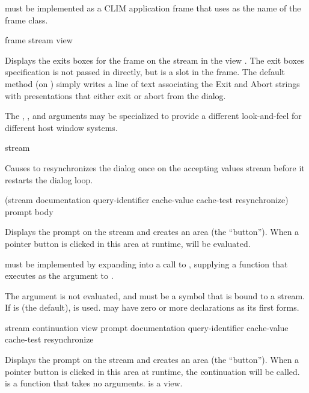 
 must be implemented as a CLIM application frame that uses
 as the name of the frame class.


 {frame stream view}

Displays the exits boxes for the  frame  on the
stream  in the view .  The exit boxes specification is not
passed in directly, but is a slot in the frame.  The default method (on
) simply writes a line of text associating the Exit and Abort
strings with presentations that either exit or abort from the dialog.

The , , and  arguments may be specialized to
provide a different look-and-feel for different host window systems.

 {stream}

Causes  to resynchronizes the dialog once on the accepting
values stream  before it restarts the dialog loop.


 {(\optional stream
                                           \key documentation query-identifier
                                                cache-value cache-test resynchronize) 
                                          prompt
                                          \body body}

Displays the prompt  on the stream  and creates an area
(the ``button'').  When a pointer button is clicked in this area at runtime,
 will be evaluated.

 must be implemented by expanding into a call
to , supplying a function that executes
 as the  argument to .

The  argument is not evaluated, and must be a symbol that is bound
to a stream.  If  is  (the default),  is used.
 may have zero or more declarations as its first forms.

           {stream continuation view prompt
            \key documentation query-identifier cache-value cache-test resynchronize}

Displays the prompt  on the stream  and creates an area
(the ``button'').  When a pointer button is clicked in this area at runtime, the
continuation will be called.   is a function that takes no
arguments.   is a view.

